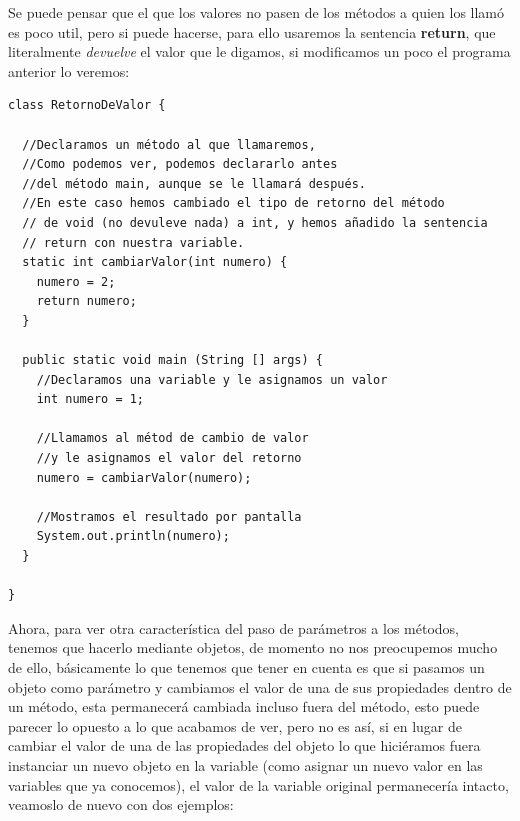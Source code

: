 \documentclass[11pt]{article}
\begin{document}
Se puede pensar que el que los valores no pasen de los métodos a quien los llamó es poco util, pero si puede hacerse, para ello usaremos la sentencia \textbf{return}, que literalmente \emph{devuelve} el valor que le digamos, si modificamos un poco el programa anterior lo veremos:

\begin{verbatim}
class RetornoDeValor {

  //Declaramos un método al que llamaremos,
  //Como podemos ver, podemos declararlo antes
  //del método main, aunque se le llamará después.
  //En este caso hemos cambiado el tipo de retorno del método
  // de void (no devuleve nada) a int, y hemos añadido la sentencia
  // return con nuestra variable.
  static int cambiarValor(int numero) {
    numero = 2;
    return numero;
  }

  public static void main (String [] args) {
    //Declaramos una variable y le asignamos un valor
    int numero = 1;

    //Llamamos al métod de cambio de valor
    //y le asignamos el valor del retorno
    numero = cambiarValor(numero);

    //Mostramos el resultado por pantalla
    System.out.println(numero);
  }

}
\end{verbatim}

Ahora, para ver otra característica del paso de parámetros a los métodos, tenemos que hacerlo mediante objetos, de momento no nos preocupemos mucho de ello, básicamente lo que tenemos que tener en cuenta es que si pasamos un objeto como parámetro y cambiamos el valor de una de sus propiedades dentro de un método, esta permanecerá cambiada incluso fuera del método, esto puede parecer lo opuesto a lo que acabamos de ver, pero no es así, si en lugar de cambiar el valor de una de las propiedades del objeto lo que hiciéramos fuera instanciar un nuevo objeto en la variable (como asignar un nuevo valor en las variables que ya conocemos), el valor de la variable original permanecería intacto, veamoslo de nuevo con dos ejemplos:
\end{document}
